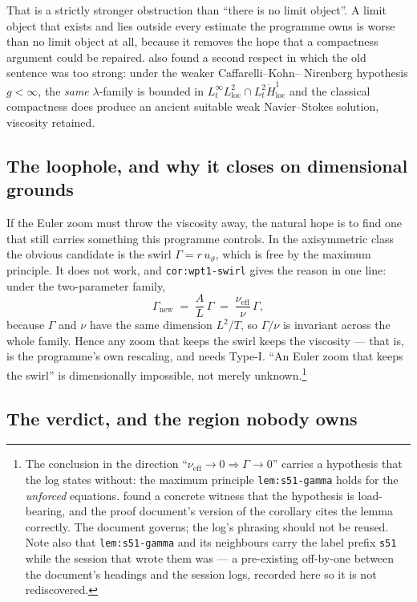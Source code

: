 That is a strictly stronger obstruction than ``there is no limit object''. A
limit object that exists and lies outside every estimate the programme owns is
worse than no limit object at all, because it removes the hope that a
compactness argument could be repaired.  also found a second respect in
which the old sentence was too strong: under the weaker Caffarelli--Kohn--%
Nirenberg hypothesis \(g<\infty\), the \emph{same} \(\lambda\)-family is bounded
in \(L^\infty_tL^2_{\mathrm{loc}}\cap L^2_t\dot H^1_{\mathrm{loc}}\) and the
classical compactness does produce an ancient suitable weak Navier--Stokes
solution, viscosity retained.

\subsection{The loophole, and why it closes on dimensional grounds}

If the Euler zoom must throw the viscosity away, the natural hope is to find one
that still carries something this programme controls. In the axisymmetric class
the obvious candidate is the swirl \(\Gamma=r\,u_\vartheta\), which is free by
the maximum principle. It does not work, and \texttt{cor:wpt1-swirl} gives the
reason in one line: under the two-parameter family,
\[
  \Gamma_{\mathrm{new}} \;=\; \frac{A}{L}\,\Gamma
  \;=\; \frac{\nu_{\mathrm{eff}}}{\nu}\,\Gamma ,
\]
because \(\Gamma\) and \(\nu\) have the same dimension \(L^2/T\), so
\(\Gamma/\nu\) is invariant across the whole family. Hence any zoom that keeps
the swirl keeps the viscosity --- that is, is the programme's own rescaling, and
needs Type-I. ``An Euler zoom that keeps the swirl'' is dimensionally
impossible, not merely unknown.\footnote{The conclusion in the direction
``\(\nu_{\mathrm{eff}}\to0\Rightarrow\Gamma\to0\)'' carries a hypothesis that
the  log states without: the maximum principle \texttt{lem:s51-gamma}
holds for the \emph{unforced} equations.  found a concrete witness that
the hypothesis is load-bearing, and the proof document's version of the
corollary cites the lemma correctly. The document governs; the  log's
phrasing should not be reused. Note also that \texttt{lem:s51-gamma} and its
neighbours carry the label prefix \texttt{s51} while the session that wrote
them was  --- a pre-existing off-by-one between the document's headings
and the session logs, recorded here so it is not rediscovered.}

\subsection{The verdict, and the region nobody owns}

